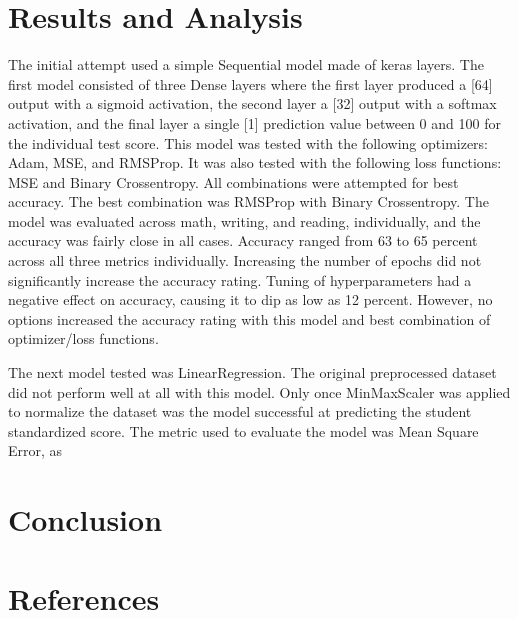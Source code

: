 \documentclass[doc]{apa6} %
\begin{document}
\section{Results and Analysis}
The initial attempt used a simple Sequential model made of keras layers. The first model consisted of three Dense layers where the first layer produced a [64]  output with a sigmoid activation, the second layer a [32] output with a softmax activation, and the final layer a single [1] prediction value between 0 and 100 for the individual test score.  This model was tested with the following optimizers: Adam, MSE, and RMSProp. It was also tested with the following loss functions: MSE and Binary Crossentropy. All combinations were attempted for best accuracy. The best combination was RMSProp with Binary Crossentropy. The model was evaluated across math, writing, and reading, individually, and the accuracy was fairly close in all cases. Accuracy ranged from 63 to 65 percent across all three metrics individually.  Increasing the number of epochs did not significantly increase the accuracy rating.  Tuning of hyperparameters had a negative effect on accuracy, causing it to dip as low as 12 percent.  However, no options increased the accuracy rating with this model and best combination of optimizer/loss functions.

The next model tested was LinearRegression. The original preprocessed dataset did not perform well at all with this model. Only once MinMaxScaler was applied to normalize the dataset was the model successful at predicting the student standardized score. The metric used to evaluate the model was Mean Square Error, as 


\section{Conclusion}

\section{References}
\end{document}
